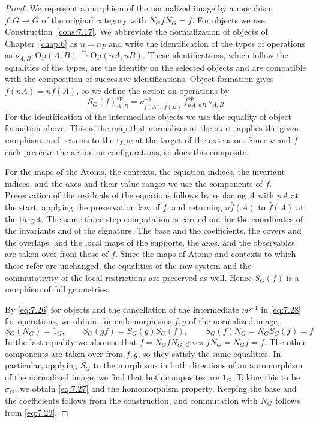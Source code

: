 \begin{proof}

We represent a morphism of the normalized image by a morphism $f:G\to G$ of the original
category with $N_GfN_G=f$.
For objects we use Construction~\ref{cons:7.17}. We abbreviate the normalization of objects
of Chapter~\ref{chap:6} as $n=n_P$ and write the identification of the types of operations as
$\nu_{A,B}:\mathrm{Op}(A,B)\xrightarrow{\sim}\mathrm{Op}(nA,nB)$.
These identifications, which follow the equalities of the types, are the identity on the
selected objects and are compatible with the composition of successive identifications.
Object formation gives $f(nA)=n\widehat f(A)$, so we define the action on operations by
\begin{equation*}
S_G(f)_{A,B}^{\mathrm{op}}
=\nu_{\widehat f(A),\widehat f(B)}^{-1}
\,f_{nA,nB}^{\mathrm{op}}\,\nu_{A,B}
\tag{7.28}\label{eq:7.28}
\end{equation*}
For the identification of the intermediate objects we use the equality of object formation
above.
This is the map that normalizes at the start, applies the given morphism, and returns to the
type at the target of the extension.
Since $\nu$ and $f$ each preserve the action on configurations, so does this composite.

For the maps of the Atoms, the contexts, the equation indices, the invariant indices, and
the axes and their value ranges we use the components of $f$.
Preservation of the residuals of the equations follows by replacing $A$ with $nA$ at the
start, applying the preservation law of $f$, and returning $n\widehat f(A)$ to
$\widehat f(A)$ at the target.
The same three-step computation is carried out for the coordinates of the invariants and of
the signature.
The base and the coefficients, the covers and the overlaps, and the local maps of the
supports, the axes, and the observables are taken over from those of $f$.
Since the maps of Atoms and contexts to which these refer are unchanged, the equalities of
the raw system and the commutativity of the local restrictions are preserved as well.
Hence $S_G(f)$ is a morphism of full geometries.

By \eqref{eq:7.26} for objects and the cancellation of the intermediate $\nu\nu^{-1}$ in
\eqref{eq:7.28} for operations, we obtain, for endomorphisms $f,g$ of the normalized image,
\begin{equation*}
S_G(N_G)=1_G,\qquad
S_G(gf)=S_G(g)S_G(f),\qquad
S_G(f)N_G=N_GS_G(f)=f
\tag{7.29}\label{eq:7.29}
\end{equation*}
In the last equality we also use that $f=N_GfN_G$ gives $fN_G=N_Gf=f$.
The other components are taken over from $f,g$, so they satisfy the same equalities.
In particular, applying $S_G$ to the morphisms in both directions of an automorphism of
the normalized image, we find that both composites are $1_G$.
Taking this to be $\sigma_G$, we obtain \eqref{eq:7.27} and the homomorphism property.
Keeping the base and the coefficients follows from the construction, and commutation with
$N_G$ follows from \eqref{eq:7.29}.

\end{proof}

